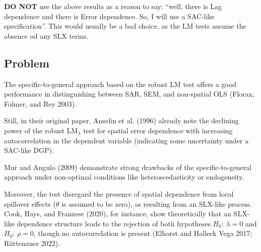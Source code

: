\documentclass[
  letterpaper,
]{scrbook}
\begin{document}
\begin{tcolorbox}[enhanced jigsaw, colframe=quarto-callout-warning-color-frame, coltitle=black, titlerule=0mm, opacitybacktitle=0.6, toprule=.15mm, colbacktitle=quarto-callout-warning-color!10!white, toptitle=1mm, leftrule=.75mm, colback=white, bottomtitle=1mm, opacityback=0, left=2mm, title=\textcolor{quarto-callout-warning-color}{\faExclamationTriangle}\hspace{0.5em}{Take the LM test with a grain of salt}, breakable, arc=.35mm, rightrule=.15mm, bottomrule=.15mm]

\textbf{DO NOT} use the above results as a reason to say: ``well, there
is Lag dependence and there is Error dependence. So, I will use a
SAC-like specification''. This would usually be a bad choice, as the LM
tests assume the absence od any SLX terms.

\end{tcolorbox}

\hypertarget{problem}{%
\subsection{Problem}\label{problem}}

The specific-to-general approach based on the robust LM test offers a
good performance in distinguishing between SAR, SEM, and non-spatial OLS
(Florax, Folmer, and Rey 2003).

Still, in their original paper, Anselin et al. (1996) already note the
declining power of the robust LM\(_\lambda\) test for spatial error
dependence with increasing autocorrelation in the dependent variable
(indicating some uncertainty under a SAC-like DGP).

Mur and Angulo (2009) demonstrate strong drawbacks of the
specific-to-general approach under non-optimal conditions like
heteroscedasticity or endogeneity.

Moreover, the test disregard the presence of spatial dependence from
local spillover effects (\(\theta\) is assumed to be zero), as resulting
from an SLX-like process. Cook, Hays, and Franzese (2020), for instance,
show theoretically that an SLX-like dependence structure leads to the
rejection of both hypotheses \(H_0\): \(\lambda=0\) and \(H_0\):
\(\rho=0\), though no autocorrelation is present (Elhorst and Halleck
Vega 2017; Rüttenauer 2022).
\end{document}

